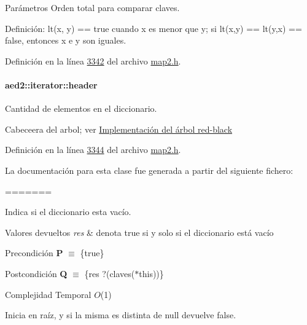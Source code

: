\begin{DoxyParams}{\-Parámetros}
\-Orden total para comparar claves. 

\-Definición\-: lt(x, y) == true cuando x es menor que y; si lt(x,y) == lt(y,x) == false, entonces x e y son iguales. 

\-Definición en la línea \hyperlink{map2_8h_source_l03342}{3342} del archivo \hyperlink{map2_8h_source}{map2.\-h}.

\hypertarget{classaed2_1_1iterator_a19db18e2e77583eb1fa819e854ff9c71_a19db18e2e77583eb1fa819e854ff9c71}{
\paragraph[{header}]{ {\bf aed2\-::iterator\-::header}}}\label{classaed2_1_1iterator_a19db18e2e77583eb1fa819e854ff9c71_a19db18e2e77583eb1fa819e854ff9c71}


\-Cantidad de elementos en el diccionario. 

\-Cabeceera del arbol; ver \hyperlink{Implementacion}{\-Implementación del árbol red-\/black} 

\-Definición en la línea \hyperlink{map2_8h_source_l03344}{3344} del archivo \hyperlink{map2_8h_source}{map2.\-h}.



\-La documentación para esta clase fue generada a partir del siguiente fichero\-:\begin{DoxyCompactItemize}
=======


Indica si el diccionario esta vacío. 


\begin{DoxyRetVals}{Valores devueltos}
{\em res} & denota true si y solo si el diccionario está vacío\\
\hline
\end{DoxyRetVals}
\begin{DoxyPrecond}{Precondición}
{\bfseries P} $\equiv$ \{true\} 
\end{DoxyPrecond}
\begin{DoxyPostcond}{Postcondición}
{\bfseries Q} $\equiv$ \{res   ?(claves($\ast$this))\}
\end{DoxyPostcond}

\begin{DoxyDescription}
\item[Complejidad Temporal]$O$(1)
\end{DoxyDescription}Inicia en raíz, y si la misma es distinta de null devuelve false. 


\end{DoxyCompactItemize}
\end{DoxyParams}
